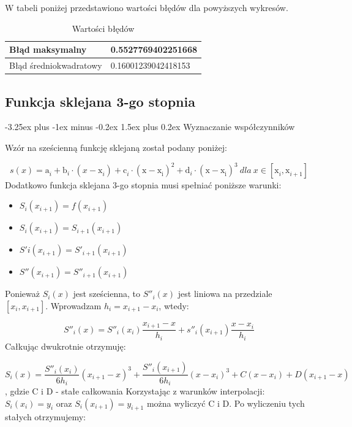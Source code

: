 \documentclass{article}
\makeatletter
\renewcommand{\paragraph}{\@startsection{paragraph}{4}{0ex}%
   {-3.25ex plus -1ex minus -0.2ex}%
   {1.5ex plus 0.2ex}%
   {\normalfont\normalsize\bfseries}}
\makeatother
\begin{document}
W tabeli poniżej przedstawiono wartości błędów dla powyższych wykresów.

\begin{table}[!ht]
    \centering
    \begin{tabular}{|l|l|}
    \hline
        Błąd maksymalny & 0.5527769402251668 \\ \hline
        Błąd średniokwadratowy & 0.16001239042418153 \\ \hline
    \end{tabular}
    \caption{Wartości błędów}
\end{table}

\newpage

\subsection{Funkcja sklejana 3-go stopnia}

\paragraph{Wyznaczanie współczynników}

Wzór na sześcienną funkcję sklejaną został podany poniżej:

\[s(x) = \mathrm{a}_{i}^{} + \mathrm{b}_{i}^{}\cdot (x - \mathrm{x}_{i}^{}) +\mathrm{c}_{i}^{}\cdot \mathrm{(x - \mathrm{x}_{i}^{})}_{}^{2} + \mathrm{d}_{i}^{}\cdot  \mathrm{(x-\mathrm{x}_{i}^{})}_{}^{3} \ dla \ x \in [\mathrm{x}_{i}^{}, \mathrm{x}_{i + 1}^{}]\]
\noindent
Dodatkowo funkcja sklejana 3-go stopnia musi spełniać poniższe warunki:
\begin{itemize}
\item \(S_i(x_{i+1}) = f(x_{i+1})\)
\item \(S_i(x_{i+1}) = S_{i+1}(x_{i+1})\)
\item \(S'i(x_{i+1}) = S'_{i+1}(x_{i+1})\)
\item \(S''(x_{i+1}) = S''_{i+1}(x_{i+1})\)
\end{itemize}
\noindent
Ponieważ \(S_i(x)\) jest sześcienna, to \(S''_i(x)\) jest liniowa na przedziale \([x_i, x_{i+1}]\). Wprowadzam \(h_i = x_{i+1} - x_i\), wtedy:

\[S''_i(x) = S''_i(x_i)\frac{x_{i+1}-x}{h_i} + s''_i(x_{i+1})\frac{x-x_i}{h_i}\]
\noindent
Całkując dwukrotnie otrzymuję:

\[S_i(x) = \frac{S''_i(x_i)}{6h_i}(x_{i+1}-x)^3 + \frac{S''_i(x_{i+1})}{6h_i}(x-x_i)^3+C(x-x_i)+D(x_{i+1}-x)\],
\noindent
gdzie C i D - stałe całkowania
\noindent
Korzystając z warunków interpolacji:
\noindent
\(S_i(x_i) = y_i\) oraz \(S_i(x_{i+1}) = y_{i+1}\) można wyliczyć C i D. Po wyliczeniu tych stałych otrzymujemy:
\end{document}
